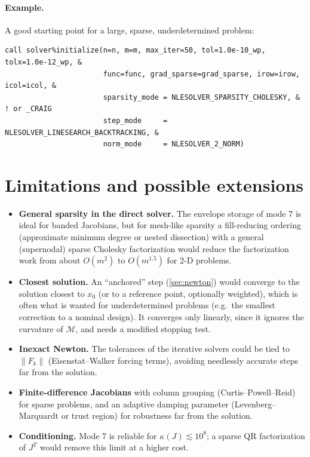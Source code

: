 \documentclass[11pt]{article}
\newcommand{\norm}[1]{\left\lVert #1 \right\rVert}
\newcommand{\cond}{\kappa}
\begin{document}
\paragraph{Example.} A good starting point for a large, sparse, underdetermined problem:
\begin{lstlisting}
call solver%initialize(n=n, m=m, max_iter=50, tol=1.0e-10_wp, tolx=1.0e-12_wp, &
                       func=func, grad_sparse=grad_sparse, irow=irow, icol=icol, &
                       sparsity_mode = NLESOLVER_SPARSITY_CHOLESKY, &   ! or _CRAIG
                       step_mode     = NLESOLVER_LINESEARCH_BACKTRACKING, &
                       norm_mode     = NLESOLVER_2_NORM)
\end{lstlisting}

\section{Limitations and possible extensions}
\label{sec:future}

\begin{itemize}
  \item \textbf{General sparsity in the direct solver.} The envelope storage of mode 7 is ideal for
  banded Jacobians, but for mesh-like sparsity a fill-reducing ordering (approximate minimum degree
  \cite{amd} or nested dissection) with a general (supernodal) sparse Cholesky factorization would
  reduce the factorization work from about $O(m^2)$ to $O(m^{1.5})$ for 2-D problems.
  \item \textbf{Closest solution.} An ``anchored'' step (\cref{sec:newton}) would converge to the
  solution closest to $x_0$ (or to a reference point, optionally weighted), which is often what is
  wanted for underdetermined problems (e.g.\ the smallest correction to a nominal design). It converges
  only linearly, since it ignores the curvature of $\mathcal{M}$, and needs a modified stopping test.
  \item \textbf{Inexact Newton.} The tolerances of the iterative solvers could be tied to $\norm{F_k}$
  (Eisenstat--Walker forcing terms), avoiding needlessly accurate steps far from the solution.
  \item \textbf{Finite-difference Jacobians} with column grouping (Curtis--Powell--Reid) for sparse
  problems, and an adaptive damping parameter (Levenberg--Marquardt or trust region) for robustness far
  from the solution.
  \item \textbf{Conditioning.} Mode 7 is reliable for $\cond(J) \lesssim 10^8$; a sparse QR factorization of
  $J^T$ would remove this limit at a higher cost.
\end{itemize}
\end{document}
